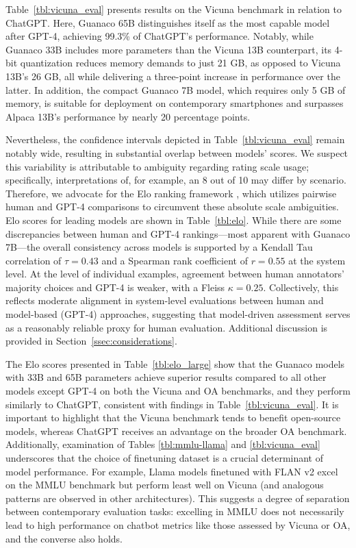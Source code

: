 Table~\ref{tbl:vicuna_eval} presents results on the Vicuna benchmark \cite{vicuna2023} in relation to ChatGPT. Here, {Guanaco} 65B distinguishes itself as the most capable model after GPT-4, achieving 99.3\% of ChatGPT’s performance. Notably, while {Guanaco} 33B includes more parameters than the Vicuna 13B counterpart, its 4-bit quantization reduces memory demands to just 21 GB, as opposed to Vicuna 13B’s 26 GB, all while delivering a three-point increase in performance over the latter. In addition, the compact {Guanaco} 7B model, which requires only 5 GB of memory, is suitable for deployment on contemporary smartphones and surpasses Alpaca 13B’s performance by nearly 20 percentage points.

Nevertheless, the confidence intervals depicted in Table~\ref{tbl:vicuna_eval} remain notably wide, resulting in substantial overlap between models’ scores. We suspect this variability is attributable to ambiguity regarding rating scale usage; specifically, interpretations of, for example, an 8 out of 10 may differ by scenario. Therefore, we advocate for the Elo ranking framework \citep{elo1967proposed}, which utilizes pairwise human and GPT-4 comparisons to circumvent these absolute scale ambiguities. Elo scores for leading models are shown in Table~\ref{tbl:elo}. While there are some discrepancies between human and GPT-4 rankings—most apparent with Guanaco 7B—the overall consistency across models is supported by a Kendall Tau correlation of $\tau=0.43$ and a Spearman rank coefficient of $r=0.55$ at the system level. At the level of individual examples, agreement between human annotators' majority choices and GPT-4 is weaker, with a Fleiss $\kappa=0.25$. Collectively, this reflects moderate alignment in system-level evaluations between human and model-based (GPT-4) approaches, suggesting that model-driven assessment serves as a reasonably reliable proxy for human evaluation. Additional discussion is provided in Section~\ref{ssec:considerations}.

The Elo scores presented in Table~\ref{tbl:elo_large} show that the {Guanaco} models with 33B and 65B parameters achieve superior results compared to all other models except GPT-4 on both the Vicuna and OA benchmarks, and they perform similarly to ChatGPT, consistent with findings in Table~\ref{tbl:vicuna_eval}. It is important to highlight that the Vicuna benchmark tends to benefit open-source models, whereas ChatGPT receives an advantage on the broader OA benchmark. Additionally, examination of Tables \ref{tbl:mmlu-llama} and \ref{tbl:vicuna_eval} underscores that the choice of finetuning dataset is a crucial determinant of model performance. For example, Llama models finetuned with FLAN v2 excel on the MMLU benchmark but perform least well on Vicuna (and analogous patterns are observed in other architectures). This suggests a degree of separation between contemporary evaluation tasks: excelling in MMLU does not necessarily lead to high performance on chatbot metrics like those assessed by Vicuna or OA, and the converse also holds.

